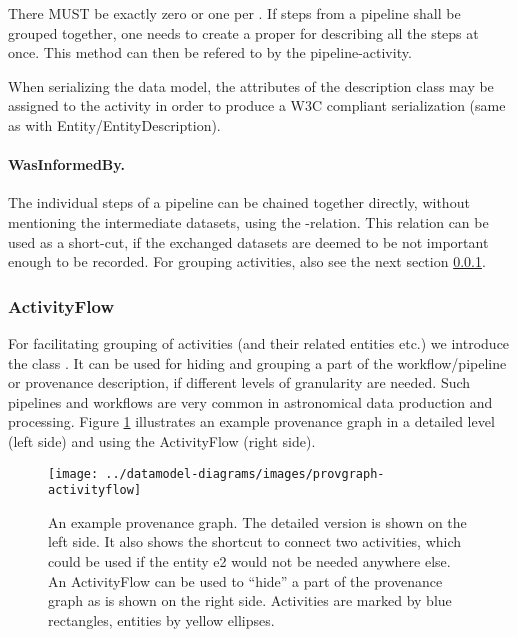 There MUST be exactly zero or one  per . If steps from a 
pipeline shall be grouped together, one needs to create a proper 
 for describing all the steps at once. This method can then 
be refered to by the pipeline-activity. 

When serializing the data model, the attributes
of the description class may be assigned to the activity in order to produce 
a W3C compliant serialization (same as with Entity/EntityDescription).


\paragraph{WasInformedBy.}
The individual steps of a pipeline can be chained
together directly, without mentioning the intermediate datasets, using the -relation.
This relation can be used as a short-cut, if the exchanged datasets are deemed to be not important
enough to be recorded. For grouping activities, also see the 
next section \ref{sec:activityflow}.


\subsubsection{ActivityFlow}\label{sec:activityflow}
For facilitating grouping of activities (and their related entities etc.)
we introduce the class .
It can be used for hiding and grouping a part of the workflow/pipeline 
or provenance 
description, if different levels of granularity are needed. Such pipelines and workflows are very common in astronomical data production and processing. Figure \ref{fig:provgraph-activityflow}
illustrates an example provenance graph in a detailed level (left side) 
and using the ActivityFlow (right side).


\begin{figure}[h]
\centering
\texttt{[image: ../datamodel-diagrams/images/provgraph-activityflow]}
\caption[Example provenance graph with ]{An example provenance graph. The detailed version is shown on the left side. It also shows
the shortcut  to connect two activities, which could be used if the entity e2 
would not be needed anywhere else.
An ActivityFlow can be used to ``hide'' a part of the provenance graph as is shown on the right side.
Activities are marked by blue rectangles, entities by yellow ellipses.}
\label{fig:provgraph-activityflow}
\end{figure}

